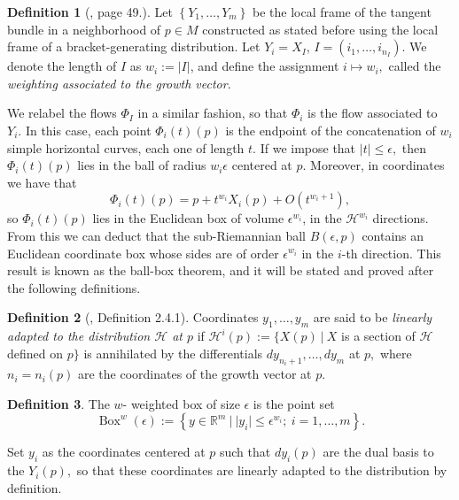 \documentclass[12pt, letterpaper, reqno]{amsart}
\theoremstyle{definition}
\newtheorem{df}{Definition}
\theoremstyle{plain}
\theoremstyle{remark}
\begin{document}
\begin{df}[\cite{montgomery2002tour}, page 49.] Let $ \left\{ Y_1,\dots, Y_m \right\} $ be the local frame of the tangent bundle in a neighborhood of $ p\in M $ constructed as stated before using the local frame of a bracket-generating distribution. Let $ Y_i=X_I $, $ I=(i_1,\dots,i_{n_I}) $. We denote the length of $ I $ as $ w_i:= \left| I \right| $, and define the assignment $ i\mapsto w_i, $ called the \textit{weighting associated to the growth vector}. 
	
\end{df}

We relabel the flows $ \Phi_I $ in a similar fashion, so that $ \Phi_i $ is the flow associated to $ Y_i. $ In this case, each point $ \Phi_i(t)(p) $ is the endpoint of the concatenation of $ w_i $ simple horizontal curves, each one of length $ t $. If we impose that $ \left| t \right|\leq \epsilon, $ then $ \Phi_i(t)(p) $ lies in the ball of radius $ w_i\epsilon $ centered at $ p. $ Moreover, in coordinates we have that 
$$ \Phi_i(t)(p)=p+t^{w_i}X_i(p)+ O(t^{w_i+1}), $$ 
so $ \Phi_i(t)(p) $ lies in the Euclidean box of volume $ \epsilon^{w_i} $, in the $ \mathcal{H}^{w_i} $ directions. From this we can deduct that the sub-Riemannian ball $ B(\epsilon,p) $ contains an Euclidean coordinate box whose sides are of order $ \epsilon^{w_i} $ in the $ i $-th direction. This result is known as the ball-box theorem, and it will be stated and proved after the following definitions.

\begin{df}[\cite{montgomery2002tour}, Definition 2.4.1] 
	Coordinates $ y_1,\dots,y_m $ are said to be \textit{linearly adapted to the distribution $\mathcal{H}$ at $ p $ } if $ \mathcal{H}^i(p):= \{ X(p) \ | \ X$ is a section of $\mathcal{H}$ defined on $p$$\}$ is annihilated by the differentials $ dy_{n_i+1},\dots, dy_m $ at $ p, $ where $ n_i=n_i(p) $ are the coordinates of the growth vector at $ p. $  
\end{df}
\begin{df}
	The $ w $- weighted box of size $ \epsilon $ is the point set
	$$ \operatorname{Box}^w(\epsilon) := \left\{ y\in \mathbb{R}^m \ | \ |y_i|\leq \epsilon^{w_i}; \ i=1,\dots,m \right\}.  $$ 
\end{df}

Set $ y_i $ as the coordinates centered at $ p $ such that $ dy_i(p) $ are the dual basis to the $ Y_i(p), $ so that these coordinates are linearly adapted to the distribution by definition.
\end{document}
